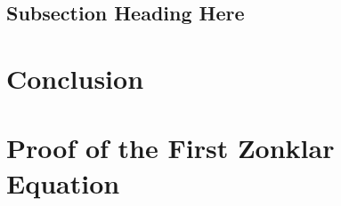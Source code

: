 \documentclass[conference]{IEEEtran}
\begin{document}

\subsection{Subsection Heading Here}
\blindtext


\section{Conclusion}
\blindtext


\appendices
\section{Proof of the First Zonklar Equation}
\blindtext

\end{document}
